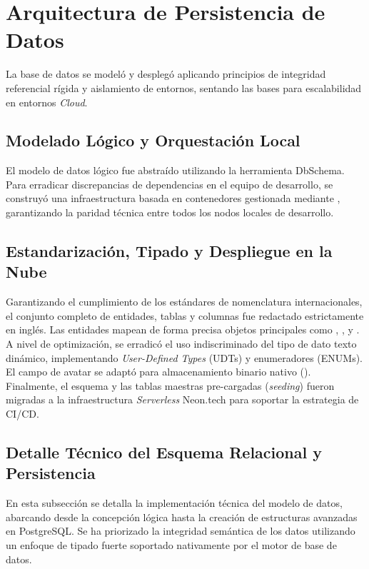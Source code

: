 \section{Arquitectura de Persistencia de Datos}
\label{sec:base_datos}

La base de datos se modeló y desplegó aplicando principios de integridad referencial rígida y aislamiento de entornos, sentando las bases para escalabilidad en entornos \textit{Cloud}.

\subsection{Modelado Lógico y Orquestación Local}
El modelo de datos lógico fue abstraído utilizando la herramienta DbSchema. Para erradicar discrepancias de dependencias en el equipo de desarrollo, se construyó una infraestructura basada en contenedores gestionada mediante , garantizando la paridad técnica entre todos los nodos locales de desarrollo. 

\subsection{Estandarización, Tipado y Despliegue en la Nube}
Garantizando el cumplimiento de los estándares de nomenclatura internacionales, el conjunto completo de entidades, tablas y columnas fue redactado estrictamente en inglés. Las entidades mapean de forma precisa objetos principales como , ,  y . 
A nivel de optimización, se erradicó el uso indiscriminado del tipo de dato texto dinámico, implementando \textit{User-Defined Types} (UDTs) y enumeradores (ENUMs). El campo de avatar se adaptó para almacenamiento binario nativo (). Finalmente, el esquema y las tablas maestras pre-cargadas (\textit{seeding}) fueron migradas a la infraestructura \textit{Serverless} Neon.tech para soportar la estrategia de CI/CD.

\subsection{Detalle Técnico del Esquema Relacional y Persistencia}
\label{ssec:detalle_db}

En esta subsección se detalla la implementación técnica del modelo de datos, abarcando desde la concepción lógica hasta la creación de estructuras avanzadas en PostgreSQL. Se ha priorizado la integridad semántica de los datos utilizando un enfoque de tipado fuerte soportado nativamente por el motor de base de datos.

